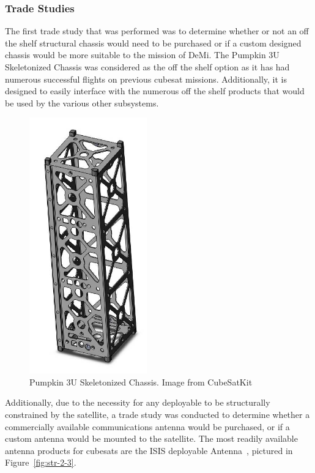\documentclass[12pt]{article}
\begin{document}
\subsubsection{Trade Studies}
The first trade study that was performed was to determine whether or not an off the shelf structural chassis would need to be purchased or if a custom designed chassis would be more suitable to the mission of DeMi. The Pumpkin 3U Skeletonized Chassis was considered as the off the shelf option as it has had numerous successful flights on previous cubesat missions. Additionally, it is designed to easily interface with the numerous off the shelf products that would be used by the various other subsystems.


\begin{figure}[!ht]
\centering
\includegraphics[width=2in]{images/STR-1.jpg}
\caption{Pumpkin 3U Skeletonized Chassis. Image from CubeSatKit\cite{cubesatkit}}
\label{fig:str-1}
\end{figure}

Additionally, due to the necessity for any deployable to be structurally constrained by the satellite, a trade study was conducted to determine whether a commercially available communications antenna would be purchased, or if a custom antenna would be mounted to the satellite. The most readily available antenna products for cubesats are the ISIS deployable Antenna~\cite{cubesatshop}, pictured in Figure~\ref{fig:str-2-3}.
\end{document}
